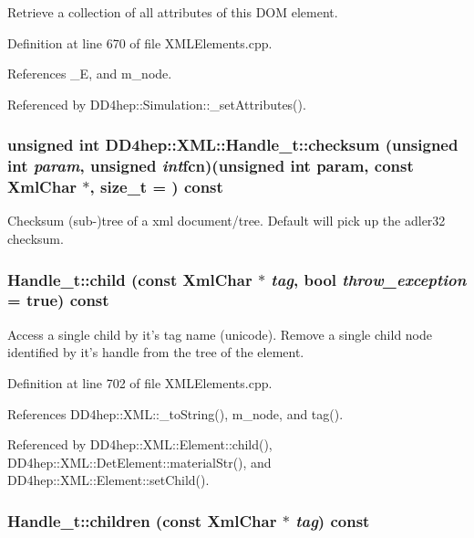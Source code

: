Retrieve a collection of all attributes of this DOM element. 

Definition at line 670 of file XMLElements.cpp.

References \_\-E, and m\_\-node.

Referenced by DD4hep::Simulation::\_\-setAttributes().\hypertarget{class_d_d4hep_1_1_x_m_l_1_1_handle__t_a46f681b65e7cdbed54b6f088a4e9320e}{
\subsubsection[{checksum}]{\setlength{\rightskip}{0pt plus 5cm}unsigned int DD4hep::XML::Handle\_\-t::checksum (unsigned int {\em param}, \/  unsigned  {\em int}fcn)(unsigned int param, const XmlChar $\ast$, size\_\-t = {}) const}}
\label{class_d_d4hep_1_1_x_m_l_1_1_handle__t_a46f681b65e7cdbed54b6f088a4e9320e}


Checksum (sub-\/)tree of a xml document/tree. Default will pick up the adler32 checksum. \hypertarget{class_d_d4hep_1_1_x_m_l_1_1_handle__t_adfaaf622234b7430c823130e4edbd8eb}{
\subsubsection[{child}]{ Handle\_\-t::child (const {\bf XmlChar} $\ast$ {\em tag}, \/  bool {\em throw\_\-exception} = {\ttfamily true}) const}}
\label{class_d_d4hep_1_1_x_m_l_1_1_handle__t_adfaaf622234b7430c823130e4edbd8eb}


Access a single child by it's tag name (unicode). Remove a single child node identified by it's handle from the tree of the element. 

Definition at line 702 of file XMLElements.cpp.

References DD4hep::XML::\_\-toString(), m\_\-node, and tag().

Referenced by DD4hep::XML::Element::child(), DD4hep::XML::DetElement::materialStr(), and DD4hep::XML::Element::setChild().\hypertarget{class_d_d4hep_1_1_x_m_l_1_1_handle__t_a8c2c6d2a04d1c4d47ad69b3db18db7f7}{
\subsubsection[{children}]{ Handle\_\-t::children (const {\bf XmlChar} $\ast$ {\em tag}) const}}
\label{class_d_d4hep_1_1_x_m_l_1_1_handle__t_a8c2c6d2a04d1c4d47ad69b3db18db7f7}


